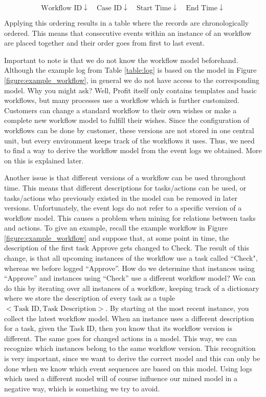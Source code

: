 \documentclass[a4paper,11pt]{article}
\begin{document}
\begin{equation}
\text{Workflow ID} \downarrow \quad \text{Case ID} \downarrow \quad \text{Start Time} \downarrow \quad \text{End Time} \downarrow
\end{equation}

Applying this ordering results in a table where the records are chronologically ordered. This means that consecutive events within an instance of an workflow are placed together and their order goes from first to last event. 

Important to note is that we do not know the workflow model beforehand. Although the example log from Table \ref{table:log} is based on the model in Figure \ref{figure:example_workflow}, in general we do not have access to the corresponding model. Why you might ask? Well, Profit itself only contains templates and basic workflows, but many processes use a workflow which is further customized. Customers can change a standard workflow to their own wishes or make a complete new workflow model to fulfill their wishes. Since the configuration of workflows can be done by customer, these versions are not stored in one central unit, but every environment keeps track of the workflows it uses. Thus, we need to find a way to derive the workflow model from the event logs we obtained. More on this is explained later.

Another issue is that different versions of a workflow can be used throughout time. This means that different descriptions for tasks/actions can be used, or tasks/actions who previously existed in the model can be removed in later versions. Unfortunately, the event logs do not refer to a specific version of a workflow model. This causes a problem when mining for relations between tasks and actions. To give an example, recall the example workflow in Figure \ref{figure:example_workflow} and suppose that, at some point in time, the description of the first task Approve gets changed to Check. The result of this change, is that all upcoming instances of the workflow use a task called ``Check", whereas we before logged ``Approve''. How do we determine that instances using ``Approve'' and instances using ``Check'' use a different workflow model? We can do this by iterating over all instances of a workflow, keeping track of a dictionary where we store the description of every task as a tuple $<\text{Task ID}, \text{Task Description}>$. By starting at the most recent instance, you collect the latest workflow model. When an instance uses a different description for a task, given the Task ID, then you know that its workflow version is different. The same goes for changed actions in a model. This way, we can recognize which instances belong to the same workflow version. This recognition is very important, since we want to derive the correct model and this can only be done when we know which event sequences are based on this model. Using logs which used a different model will of course influence our mined model in a negative way, which is something we try to avoid.
\end{document}
